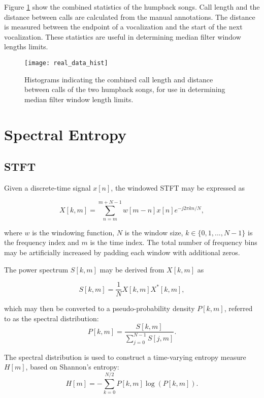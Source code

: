 Figure \ref{fig:fbhist} show the combined statistics of the humpback songs. Call length and the distance between calls are calculated from the manual annotations. The distance is measured between the endpoint of a vocalization and the start of the next vocalization. These statistics are useful in determining median filter window lengths limits.

\begin{figure}[h!]
	\centering
	\texttt{[image: real\_data\_hist]}
	\caption{Histograms indicating the combined call length and distance between calls of the two humpback songs, for use in determining median filter window length limits.}
	\label{fig:fbhist}
\end{figure}

\section{Spectral Entropy}
\subsection{STFT}
Given a discrete-time signal $x[n]$, the windowed STFT may be expressed as

\begin{equation*}
	X[k, m] = \sum_{n=m}^{m + N - 1} w[m-n] x[n] e^{-j 2 \pi k n / N },
\end{equation*}

\noindent where $w$ is the windowing function, $N$ is the window size, $k \in \{0, 1, ..., N-1\}$ is the frequency index and $m$ is the time index. The total number of frequency bins may be artificially increased by padding each window with additional zeros.

The power spectrum $S[k, m]$ may be derived from $X[k, m]$ as

\begin{equation*}
	S[k,m] = \frac{1}{N}X[k,m] X^*[k,m],
\end{equation*}

\noindent which may then be converted to a pseudo-probability density $P[k,m]$, referred to as the spectral distribution:
\begin{equation}
\label{eqn:specdist}
	P[k,m] = \frac{S[k,m]}{\sum_{j=0}^{N-1} S[j,m]}.
\end{equation}

The spectral distribution is used to construct a time-varying entropy measure $H[m]$, based on Shannon's entropy:
\begin{equation}
\label{eqn:entropy}
	H[m] = - \sum_{k=0}^{N/2} P[k,m] \log (P[k,m]).
\end{equation}

